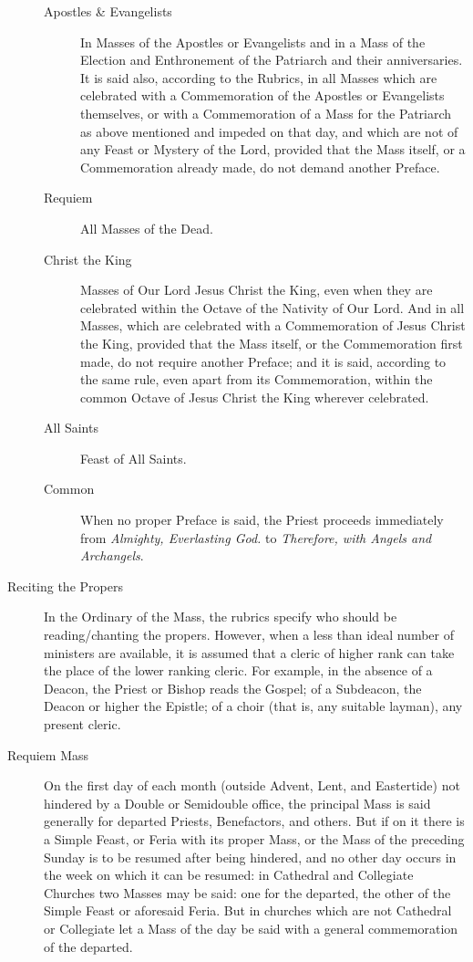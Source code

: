 \begin{description}
\begin{description}
            \item[Apostles \& Evangelists] In Masses of the Apostles or Evangelists and in a Mass of the Election and Enthronement of the Patriarch and their anniversaries. It is said also, according to the Rubrics, in all Masses which are celebrated with a Commemoration of the Apostles or Evangelists themselves, or with a Commemoration of a Mass for the Patriarch as above mentioned and impeded on that day, and which are not of any Feast or Mystery of the Lord, provided that the Mass itself, or a Commemoration already made, do not demand another Preface.
            \item[Requiem] All Masses of the Dead.
            \item[Christ the King] Masses of Our Lord Jesus Christ the King, even when they are celebrated within the Octave of the Nativity of Our Lord. And in all Masses, which are celebrated with a Commemoration of Jesus Christ the King, provided that the Mass itself, or the Commemoration first made, do not require another Preface; and it is said, according to the same rule, even apart from its Commemoration, within the common Octave of Jesus Christ the King wherever celebrated.
            \item[All Saints] Feast of All Saints.
            \item[Common] When no proper Preface is said, the Priest proceeds immediately from \emph{Almighty, Everlasting God.} to \emph{Therefore, with Angels and Archangels}.
            \end{description}
    \item[Reciting the Propers] In the Ordinary of the Mass, the rubrics specify who should be reading/chanting the propers. However, when a less than ideal number of ministers are available, it is assumed that a cleric of higher rank can take the place of the lower ranking cleric. For example, in the absence of a Deacon, the Priest or Bishop reads the Gospel; of a Subdeacon, the Deacon or higher the Epistle; of a choir (that is, any suitable layman), any present cleric.
    \item[Requiem Mass] On the first day of each month (outside Advent, Lent, and Eastertide) not hindered by a Double or Semidouble office, the principal Mass is said generally for departed Priests, Benefactors, and others. But if on it there is a Simple Feast, or Feria with its proper Mass, or the Mass of the preceding Sunday is to be resumed after being hindered, and no other day occurs in the week on which it can be resumed: in Cathedral and Collegiate Churches two Masses may be said: one for the departed, the other of the Simple Feast or aforesaid Feria. But in churches which are not Cathedral or Collegiate let a Mass of the day be said with a general commemoration of the departed.\par

\end{description}
